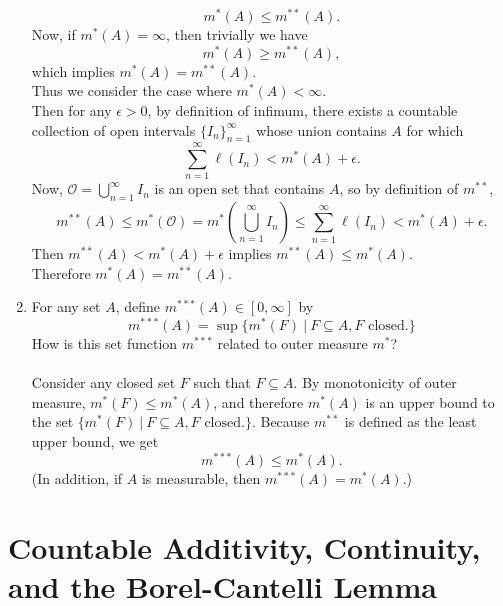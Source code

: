 \begin{enumerate}
	\[
		m^*(A)\le m^{**}(A).
	\]
	Now, if $m^*(A)=\infty$, then trivially we have
	\[
		m^*(A)\ge m^{**}(A),
	\]
	which implies $m^*(A)= m^{**}(A)$.\\
	Thus we consider the case where $m^*(A)<\infty$.\\
	Then for any $\epsilon>0$, by definition of infimum, there exists a countable collection of open intervals $\{I_n\}_{n=1}^\infty$ whose union contains $A$ for which 
	\[
		\sum_{n=1}^\infty \ell(I_n) <m^*(A)+\epsilon.
	\]
	Now, $\mathcal{O}=\bigcup_{n=1}^\infty I_n$ is an open set that contains $A$, so by definition of $m^{**}$,
	\[
		m^{**}(A)\le m^*(\mathcal{O})=m^*(\bigcup_{n=1}^\infty I_n)\le\sum_{n=1}^\infty \ell(I_n) <m^*(A)+\epsilon.
	\]
	Then $m^{**}(A)<m^*(A)+\epsilon$ implies $m^{**}(A)\le m^*(A)$.\\
	Therefore $m^*(A)= m^{**}(A)$.
	\item For any set $A$, define $m^{***}(A)\in[0,\infty]$ by
	\[
		m^{***}(A)=\sup\{m^*(F)\ |\ F\subseteq A, F\text{ closed.}\}	
	\]
	How is this set function $m^{***}$ related to outer measure $m^*$?\\
	\\Consider any closed set $F$ such that $F\subseteq A$.
	By monotonicity of outer measure, $m^*(F)\le m^*(A)$, and therefore $m^*(A)$ is an upper bound to the set $\{m^*(F)\ |\ F\subseteq A, F\text{ closed.}\}$.
	Because $m^{**}$ is defined as the least upper bound, we get
	\[
		m^{***}(A)\le m^*(A).
	\]
	(In addition, if $A$ is measurable, then $m^{***}(A)= m^*(A)$.)
\end{enumerate}

\section{Countable Additivity, Continuity, and the Borel-Cantelli Lemma}

